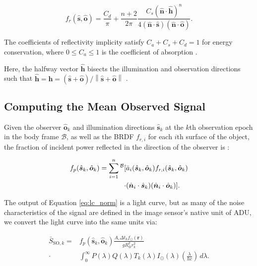 \documentclass[a4paper,twocolumn]{spaceDebrisC} %
\newcommand{\vctr}[1]{\bm{#1}}
\newcommand{\unitv}[1]{\hat{\vctr{#1}}}
\newcommand{\preup}[1]{\prescript{#1}{}{}}
\newcommand{\rf}[1]{\mathcal{\MakeUppercase{#1}}}
\newcommand{\prf}[1]{\preup{\rf{#1}}}
\newcommand{\norm}[1]{\left\lVert#1\right\rVert}
\begin{document}
\begin{equation} \label{eq:brdf_blinn_phong}
 f_r(\unitv{s}, \unitv{o}) = \frac{C_d}{\pi} + \frac{n+2}{2\pi} \frac{C_s (\unitv{n} \cdot \unitv{h})^n}{4 (\unitv{n} \cdot \unitv{s})(\unitv{n} \cdot \unitv{o})}.
\end{equation}

The coefficients of reflectivity implicity satisfy $C_a + C_s + C_d = 1$ for energy conservation, where $ 0 \leq C_a \leq 1$ is the coefficient of absorption \cite{fan2020thesis}.

Here, the halfway vector $\unitv{h}$ bisects the illumination and observation directions such that $\unitv{h} = \unitv{h} = (\unitv{s} + \unitv{o})/\norm{\unitv{s} + \unitv{o}}$ \cite{duvenhage2013}.

\subsection{Computing the Mean Observed Signal}

Given the observer $\unitv{o}_k$ and illumination directions $\unitv{s}_k$ at the $k$th observation epoch in the body frame $\mathcal{B}$, as well as the BRDF $f_{r,i}$ for each $i$th surface of the object, the fraction of incident power reflected in the direction of the observer is \cite{fan2020thesis}:

\begin{equation} \label{eq:lc_norm}
  \begin{split} 
 f_p(\unitv{s}_k, \unitv{o}_k) = \sum_{i=1}^n\prf{B}[&\bar{a}_i(\unitv{s}_k, \unitv{o}_k) f_{r,i}(\unitv{s}_k, \unitv{o}_k) \\ \cdot &(\unitv{n}_i \cdot \unitv{s}_k) (\unitv{n}_i \cdot \unitv{o}_k)]. 
  \end{split} 
\end{equation}

The output of Equation \ref{eq:lc_norm} is a light curve, but as many of the noise characteristics of the signal are defined in the image sensor's native unit of ADU, we convert the light curve into the same units via:

\begin{equation} \label{eq:general_bright}
  \begin{split} 
 \bar{S}_{\text{SO},k} = &f_p(\unitv{s}_k, \unitv{o}_k) \frac{A_\circ \Delta t_k f_\odot(\vctr{r})}{g R_\oplus^2 r_k^2} \\ \cdot &\int_{0}^{\infty}{P(\lambda)Q(\lambda)T_k(\lambda) I_\odot(\lambda) \left(\frac{\lambda}{hc}\right)}\,d\lambda. 
  \end{split}
\end{equation}
\end{document}
